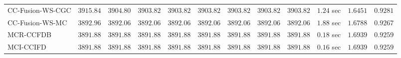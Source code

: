 \begin{table}[H]
\begin{tabular}{lrrrrrrrrrrr}
    CC-Fusion-WS-CGC & $      3915.84$ & $      3904.80$ & $      3903.82$ & $      3903.82$ & $      3903.82$ & $      3903.82$ & $      3903.82$ & $      3903.82$ & $         1.24$ sec    & $       1.6451$  & $       0.9281$ \\ 
     CC-Fusion-WS-MC & $      3892.96$ & $      3892.06$ & $      3892.06$ & $      3892.06$ & $      3892.06$ & $      3892.06$ & $      3892.06$ & $      3892.06$ & $         1.88$ sec    & $       1.6788$  & $       0.9267$ \\ 
\cmidrule{1-1} 
           MCR-CCFDB & $      3891.88$ & $      3891.88$ & $      3891.88$ & $      3891.88$ & $      3891.88$ & $      3891.88$ & $      3891.88$ & $      3891.88$ & $         0.18$ sec    & $       1.6939$  & $       0.9259$ \\ 
\cmidrule{1-1} 
           MCI-CCIFD & $      3891.88$ & $      3891.88$ & $      3891.88$ & $      3891.88$ & $      3891.88$ & $      3891.88$ & $      3891.88$ & $      3891.88$ & $         0.16$ sec    & $       1.6939$  & $       0.9259$ \\ 
\bottomrule
\end{tabular}
\end{table}

